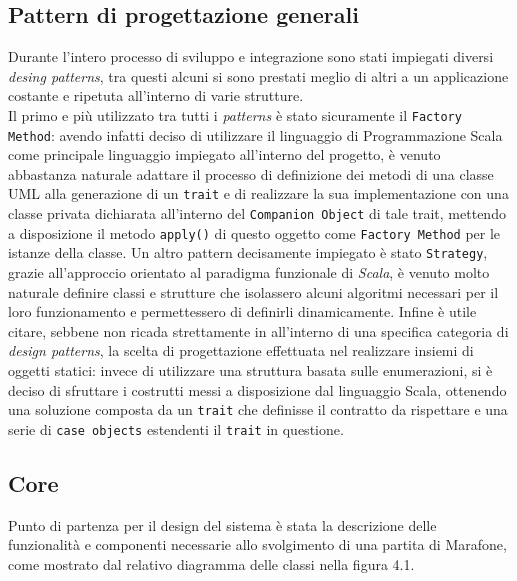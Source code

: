   \subsection {Pattern di progettazione generali}\label{subsec:details:generaldesingpattern}
  Durante l'intero processo di sviluppo e integrazione sono stati impiegati diversi \textit{desing patterns}, tra questi alcuni si sono prestati meglio di altri a un applicazione costante e ripetuta all'interno di varie strutture.\\
  Il primo e più utilizzato tra tutti i \textit{patterns} è stato sicuramente il \texttt{Factory Method}: avendo infatti deciso di utilizzare
  il linguaggio di Programmazione Scala come principale linguaggio impiegato all'interno del progetto, è venuto abbastanza naturale adattare il processo di definizione dei metodi di una classe UML alla generazione di un \texttt{trait} e di realizzare la sua implementazione con una classe privata dichiarata all'interno del \texttt{Companion Object} di tale trait, mettendo a disposizione il metodo \texttt{apply()} di questo oggetto come \texttt{Factory Method} per le istanze della classe.
  Un altro pattern decisamente impiegato è stato \texttt{Strategy}, grazie all'approccio orientato al paradigma funzionale di \textit{Scala}, è venuto molto naturale definire classi e strutture che isolassero alcuni algoritmi necessari per il loro funzionamento e permettessero di definirli dinamicamente.
  Infine è utile citare, sebbene non ricada strettamente in all'interno di una specifica categoria di \textit{design patterns}, la scelta di progettazione effettuata nel realizzare insiemi di oggetti statici: invece di utilizzare una struttura basata sulle enumerazioni, si è deciso di sfruttare i costrutti messi a disposizione dal linguaggio Scala, ottenendo una soluzione composta da un \texttt{trait} che definisse il contratto da rispettare e una serie di \texttt{case objects} estendenti il \texttt{trait} in questione.

  \subsection {Core}\label{subsec:details:core}
  Punto di partenza per il design del sistema è stata la descrizione delle funzionalità e componenti necessarie allo svolgimento di una partita di Marafone, come mostrato dal relativo diagramma delle classi nella figura 4.1.


